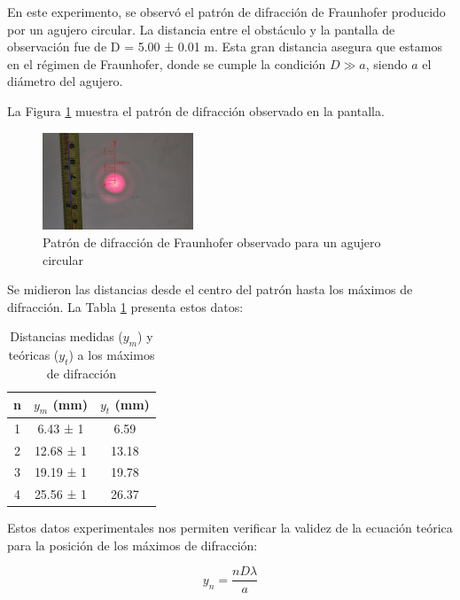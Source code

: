 \documentclass[twocolumn,a4paper,11pt]{scrartcl}
\begin{document}
En este experimento, se observó el patrón de difracción de Fraunhofer producido por un agujero circular. La distancia entre el obstáculo y la pantalla de observación fue de D = 5.00 ± 0.01 m. Esta gran distancia asegura que estamos en el régimen de Fraunhofer, donde se cumple la condición $D \gg a$, siendo $a$ el diámetro del agujero.

La Figura \ref{fig:diffraction_pattern} muestra el patrón de difracción observado en la pantalla.

\begin{figure}[h]
    \centering
    \includegraphics[width=0.4\textwidth]{fraunhoffer.png}
    \caption{Patrón de difracción de Fraunhofer observado para un agujero circular}
    \label{fig:diffraction_pattern}
\end{figure}

Se midieron las distancias desde el centro del patrón hasta los máximos de difracción. La Tabla \ref{tab:diffraction_maxima} presenta estos datos:

\vspace{1em}
\begin{table}[h!]
    \centering
    \begin{tabular}{|c|c|c|}
        \hline
        n & $y_m$ (mm) & $y_t$ (mm) \\
        \hline
        1 & 6.43 ± 1 & 6.59 \\
        2 & 12.68 ± 1 & 13.18 \\
        3 & 19.19 ± 1 & 19.78 \\
        4 & 25.56 ± 1 & 26.37 \\
        \hline
    \end{tabular}
    \caption{Distancias medidas ($y_m$) y teóricas ($y_t$) a los máximos de difracción}
    \label{tab:diffraction_maxima}
\end{table}
\vspace{1em}

Estos datos experimentales nos permiten verificar la validez de la ecuación teórica para la posición de los máximos de difracción:

\begin{equation}
y_n = \frac{nD\lambda}{a}
\end{equation}
\end{document}
